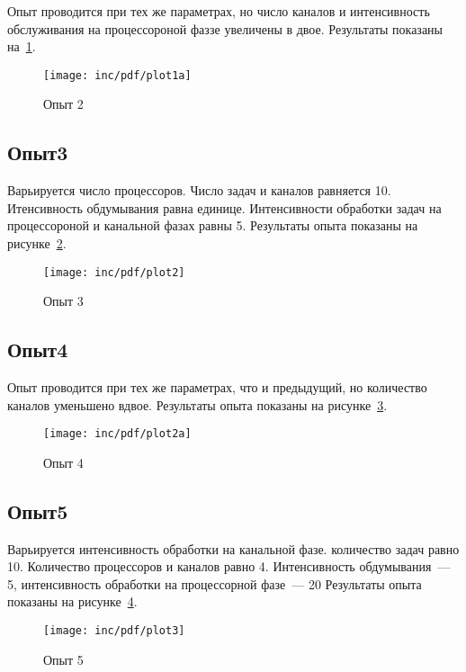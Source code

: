 Опыт проводится при тех же параметрах, но число каналов и интенсивность обслуживания на процессороной фаззе увеличены в двое. Результаты показаны на~\ref{fig:plot1a}.

\begin{figure}[ht]
  \centering
  \texttt{[image: inc/pdf/plot1a]}
  \caption{Опыт 2}
  \label{fig:plot1a}
\end{figure}


\subsection*{Опыт3}

Варьируется число процессоров. Число задач и каналов равняется 10. Итенсивность обдумывания равна единице. Интенсивности обработки задач на процессороной и канальной фазах равны 5. Результаты опыта показаны на рисунке~\ref{fig:plot2}.

\begin{figure}[ht!]
  \centering
  \texttt{[image: inc/pdf/plot2]}
  \caption{Опыт 3}
  \label{fig:plot2}
\end{figure}

\subsection*{Опыт4}

Опыт проводится при тех же параметрах, что и предыдущий, но количество каналов уменьшено вдвое. Результаты опыта показаны на рисунке~\ref{fig:plot2a}.

\begin{figure}[ht!]
  \centering
  \texttt{[image: inc/pdf/plot2a]}
  \caption{Опыт 4}
  \label{fig:plot2a}
\end{figure}

\subsection*{Опыт5}

Варьируется интенсивность обработки на канальной фазе. количество задач равно 10. Количество процессоров и каналов равно 4. Интенсивность обдумывания~--- 5, интенсивность обработки на процессорной фазе~--- 20 Результаты опыта показаны на рисунке~\ref{fig:plot3}.

\begin{figure}[ht!]
  \centering
  \texttt{[image: inc/pdf/plot3]}
  \caption{Опыт 5}
  \label{fig:plot3}
\end{figure}

